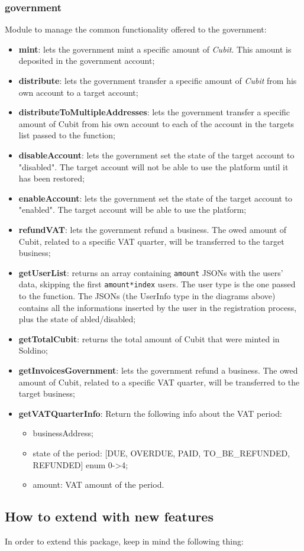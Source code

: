 \subsubsection{government}
Module to manage the common functionality offered to the government:
\begin{itemize}
	\item \textbf{mint}: lets the government mint a specific amount of \textit{Cubit}. This amount is deposited in the government account;
	\item \textbf{distribute}: lets the government transfer a specific amount of \textit{Cubit} from his own account to a target account;
	\item \textbf{distributeToMultipleAddresses}: lets the government transfer a specific amount of Cubit from his own account to each of the account in the targets list passed to the function;
	\item \textbf{disableAccount}: lets the government set the state of the target account to "disabled". The target account will not be able to use the platform until it has been restored;
	\item \textbf{enableAccount}: lets the government set the state of the target account to "enabled". The target account will be able to use the platform;
	\item \textbf{refundVAT}: lets the government refund a business. The owed amount of Cubit, related to a specific VAT quarter, will be transferred to the target business;
	\item \textbf{getUserList}: returns an array containing \texttt{amount} JSONs with the users' data, skipping the first \texttt{amount*index} users. The user type is the one passed to the function. The JSONs (the UserInfo type in the diagrams above) contains all the informations inserted by the user in the registration process, plus the state of abled/disabled;
	\item \textbf{getTotalCubit}: returns the total amount of Cubit that were minted in Soldino;
	
	\item \textbf{getInvoicesGovernment}: lets the government refund a business. The owed amount of Cubit, related to a specific VAT quarter, will be transferred to the target business;
	
	\item \textbf{getVATQuarterInfo}: Return the following info about the VAT period:
	\begin{itemize}
		\item businessAddress;
		\item state of the period: [DUE, OVERDUE, PAID, TO\_BE\_REFUNDED, REFUNDED] enum 0->4;
		\item amount: VAT amount of the period.
	\end{itemize} 
\end{itemize}
\subsection{How to extend with new features}
 In order to extend this package, keep in mind the following thing:


